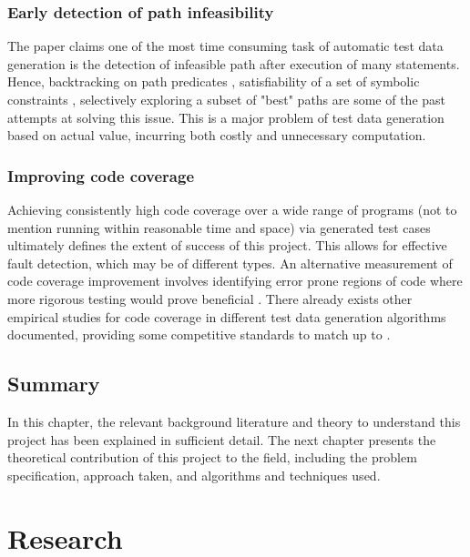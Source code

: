 \documentclass{icldt}
\numberwithin{equation}{section}       %
\begin{document}
\subsection{Early detection of path infeasibility}
The paper \cite{Tahbildar} claims one of the most time consuming task of automatic test data generation is the detection of infeasible path after execution of many statements. Hence, backtracking on path predicates \cite{Korel1990}, satisfiability of a set of symbolic constraints \cite{ZhangW01}, selectively exploring a subset of "best" paths \cite{Prather1987} are some of the past attempts at solving this issue. This is a major problem of test data generation based on actual value, incurring both costly and unnecessary computation.
\subsection{Improving code coverage}
Achieving consistently high code coverage over a wide range of programs (not to mention running within reasonable time and space) via generated test cases ultimately defines the extent of success of this project. This allows for effective fault detection, which may be of different types. An alternative measurement of code coverage improvement involves identifying error prone regions of code where more rigorous testing would prove beneficial \cite{Ntafos1988} \cite{InceDC1987}. There already exists other empirical studies for code coverage in different test data generation algorithms documented, providing some competitive standards to match up to \cite{Han2008} \cite{Rothermel99testcase} \cite{Lakhotia2009}.
\section{Summary}
In this chapter, the relevant background literature and theory to understand this project has been explained in sufficient detail. The next chapter presents the theoretical contribution of this project to the field, including the problem specification, approach taken, and algorithms and techniques used.
\chapter{Research}
\label{ch:research}
\end{document}
